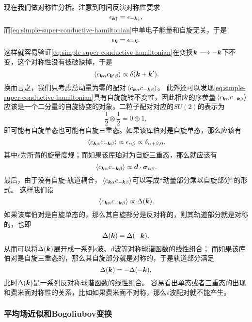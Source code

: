 \documentclass[hyperref, UTF8, a4paper]{ctexart}
\begin{document}
现在我们做对称性分析。注意到时间反演对称性要求
\[
    \epsilon_{\vb*{k} \uparrow} = \epsilon_{-\vb*{k} \downarrow},
\]
而\eqref{eq:simple-super-conductive-hamiltonian}中单电子能量和自旋无关，于是
\[
    \epsilon_{\vb*{k}} = \epsilon_{-\vb*{k}}.
\]
这样就容易验证\eqref{eq:simple-super-conductive-hamiltonian}在变换$\vb*{k} \longrightarrow -\vb*{k}$下不变，这个对称性没有被破缺掉，于是
\[
    \expval*{{c}_{\vb*{k}\alpha} {c}_{\vb*{k}' \beta}} \propto \delta(\vb*{k} + \vb*{k}').
\]
换而言之，我们只考虑总动量为零的配对$\expval*{{c}_{\vb*{k} \alpha} {c}_{- \vb*{k} \beta}}$。
此外还可以发现\eqref{eq:simple-super-conductive-hamiltonian}具有自旋旋转不变性，因此相应的序参量$\expval*{{c}_{\vb*{k} \alpha} {c}_{- \vb*{k} \beta}}$应该是一个二分量的自旋协变的对象。二粒子配对对应的$SU(2)$的表示为
\[
    \frac{1}{2} \otimes \frac{1}{2} = 0 \oplus 1,
\]
即可能有自旋单态也可能有自旋三重态。如果该库伯对是自旋单态，那么应该有
\[
    \expval*{{c}_{\vb*{k} \alpha} {c}_{- \vb*{k} \beta}} \propto \epsilon_{\alpha \beta} \propto \delta_{\alpha+\beta,0},
\]
其中$\epsilon$为所谓的旋量度规；而如果该库珀对为自旋三重态，那么就应该有
\[
    \expval*{{c}_{\vb*{k} \alpha} {c}_{- \vb*{k} \beta}} \propto \vb*{d} \cdot \vb*{\sigma}_{\alpha \beta}.
\]
最后，由于没有自旋-轨道耦合，$\expval*{{c}_{\vb*{k} \alpha} {c}_{- \vb*{k} \beta}}$可以写成“动量部分乘以自旋部分”的形式。
这样我们设
\[
    \expval*{{c}_{\vb*{k} \alpha} {c}_{- \vb*{k} \beta}} \propto \Delta(\vb*{k}).
\]
如果该库伯对是自旋单态的，那么其自旋部分是反对称的，则其轨道部分就是对称的，也即
\[
    \Delta(\vb*{k}) = \Delta(-\vb*{k}),
\]
从而可以将$\Delta(\vb*{k})$展开成一系列s波、d波等对称球谐函数的线性组合；
而如果该库伯对是自旋三重态的，那么其自旋部分就是对称的，于是轨道部分满足
\[
    \Delta(\vb*{k}) = -\Delta(-\vb*{k}),
\]
此时$\Delta(\vb*{k})$是一系列反对称球谐函数的线性组合。
容易看出单态或者三重态的出现和费米面对称性的关系，比如如果费米面不对称，那么s波配对就不能产生。

\subsubsection{平均场近似和Bogoliubov变换}
\end{document}
